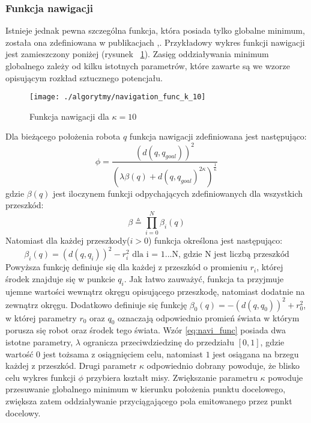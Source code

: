 \subsubsection{Funkcja nawigacji}
	Istnieje jednak pewna szczególna funkcja, która posiada tylko globalne minimum, została ona zdefiniowana w publikacjach \cite{navi_func1},\cite{navi_func2}.
	Przykładowy wykres funkcji nawigacji jest zamieszczony poniżej (rysunek ~\ref{fig:func_navi}). Zasięg oddziaływania minimum globalnego zależy od kilku istotnych parametrów, które zawarte są 
	we wzorze opisującym rozkład sztucznego potencjału.
		\begin{figure}[!h]
		\centering
		\texttt{[image: ./algorytmy/navigation\_func\_k\_10]}
		\caption{Funkcja nawigacji dla $\kappa=10$}
		\label{fig:func_navi}
		\end{figure}
	Dla bieżącego położenia robota $q$ funkcja nawigacji zdefiniowana jest następująco:
	\begin{equation}
	\label{eq:navi_func}
	\phi = \frac{(d(q,q_{goal}))^2}{ (\lambda \beta(q) + d(q,q_{goal})^{2\kappa} )^{\frac{1}{\kappa}}}
	\end{equation}
	gdzie $\beta(q)$ jest iloczynem funkcji odpychających zdefiniowanych dla wszystkich przeszkód:
	\begin{equation}
	\beta  \stackrel{ \vartriangle }{ = } \prod_{i=0}^{N}{ \beta_i(q)}    
	\end{equation}
	Natomiast dla każdej przeszkody($i>0$) funkcja określona jest następująco:
	\begin{equation}
	\beta_{i}(q)=(d(q,q_i))^2 - r_i^{2} \text{ dla i = 1...N, gdzie N jest liczbą przeszkód}
	\end{equation}
	Powyższa funkcję definiuje się dla każdej z przeszkód o promieniu $r_i$, której środek znajduje się w punkcie $q_i$.
	Jak łatwo zauważyć, funkcja ta przyjmuje ujemne wartości wewnątrz okręgu opisującego przeszkodę, natomiast dodatnie na zewnątrz okręgu.
	Dodatkowo definiuje się funkcję $\beta_{0}(q)= -(d(q,q_0))^{2} + r_0^{2}$, w której parametry $r_0$ oraz $q_0$ oznaczają odpowiednio promień świata w którym porusza się robot
	oraz środek tego świata.
	Wzór \ref{eq:navi_func} posiada dwa istotne parametry, $\lambda$ ogranicza przeciwdziedzinę do przedziału $[0,1]$, gdzie wartość $0$ jest tożsama z osiągnięciem celu, natomiast
	$1$ jest osiągana na brzegu każdej z przeszkód. Drugi parametr $\kappa$ odpowiednio dobrany powoduje, że blisko celu wykres funkcji $\phi$ przybiera kształt misy.
	Zwiększanie parametru $\kappa$ powoduje przesuwanie globalnego minimum w kierunku położenia punktu docelowego, zwiększa zatem oddziaływanie przyciągającego pola emitowanego przez 
	punkt docelowy.

